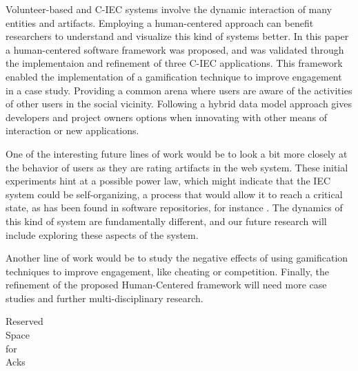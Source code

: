 Volunteer-based and C-IEC systems involve the dynamic 
interaction of many entities and artifacts. Employing a human-centered approach 
can benefit researchers to understand and visualize this kind of systems better.
In this paper a human-centered software framework was proposed, and was validated
through the implementaion and refinement of three C-IEC applications.
This framework enabled the implementation of a gamification technique 
to improve engagement in a case study. Providing a common arena where users are aware of the
activities of other users in the social vicinity. Following a hybrid data model approach
gives developers and project owners options when innovating with other means
of interaction or new applications.

One of the interesting future lines of work would be to look a bit
more closely at the behavior of users as they are rating artifacts 
in the web system. These initial experiments hint at a possible power law, which might indicate that
the IEC system could be self-organizing, a process that would allow it
to reach a critical state, as has been found in software repositories,
for instance \cite{Merelo2016:repomining}. 
The dynamics of this kind of system are fundamentally different, and our future research will
include exploring these aspects of the system. 

Another line of work would be to study the negative effects of using 
gamification techniques to improve engagement, like cheating or competition.
Finally, the refinement of the proposed Human-Centered framework will need
more case studies and further multi-disciplinary research. 

\begin{acks}
  Reserved\\
  Space\\
  for\\
  Acks

\end{acks}
